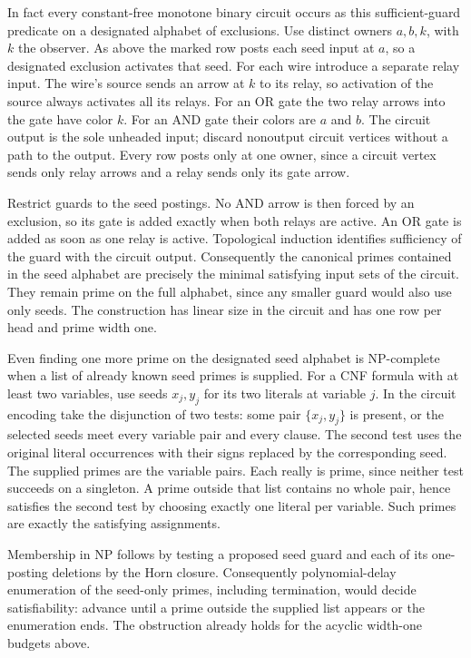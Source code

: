 In fact every constant-free monotone binary circuit occurs as
this sufficient-guard predicate on a designated
alphabet of exclusions. Use distinct owners
$a,b,k$, with $k$ the observer. As above the
marked row posts each seed input at $a$, so a
designated exclusion activates that seed. For
each wire introduce a separate relay input.
The wire's source sends an arrow at $k$ to its
relay, so activation of the source always
activates all its relays. For an OR gate the
two relay arrows into the gate have color $k$.
For an AND gate their colors are $a$ and $b$.
The circuit output is the sole unheaded input;
discard nonoutput circuit vertices without a path to the
output. Every row posts only at one owner,
since a circuit vertex sends only relay arrows
and a relay sends only its gate arrow.

Restrict guards to the seed postings. No AND
arrow is then forced by an exclusion, so its
gate is added exactly when both relays are
active. An OR gate is added as soon as one
relay is active. Topological induction identifies
sufficiency of the guard with the circuit
output. Consequently the canonical primes
contained in the seed alphabet are precisely
the minimal satisfying input sets of the circuit.
They remain prime on the full alphabet, since
any smaller guard would also use only seeds.
The construction has linear size in the circuit
and has one row per head and prime width one.

Even finding one more prime on the designated seed
alphabet is NP-complete when a list of already known
seed primes is supplied. For a CNF formula with at
least two variables, use seeds $x_j,y_j$ for its
two literals at variable $j$. In the circuit encoding
take the disjunction of two tests: some pair
$\{x_j,y_j\}$ is present, or the selected seeds meet
every variable pair and every clause. The second
test uses the original literal occurrences with
their signs replaced by the corresponding seed.
The supplied primes are the variable pairs. Each
really is prime, since neither test succeeds on a
singleton. A prime outside that list contains no
whole pair, hence satisfies the second test by
choosing exactly one literal per variable. Such
primes are exactly the satisfying assignments.

Membership in NP follows by testing a proposed
seed guard and each of its one-posting deletions
by the Horn closure. Consequently polynomial-delay
enumeration of the seed-only primes, including
termination, would decide satisfiability: advance
until a prime outside the supplied list appears
or the enumeration ends. The obstruction already
holds for the acyclic width-one budgets above.

